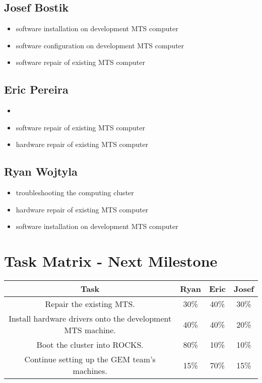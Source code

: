 \documentclass[12pt]{article}
\begin{document}
\subsection{Josef Bostik}

\begin{itemize}
  \item software installation on development MTS computer
  \item software configuration on development MTS computer
  \item software repair of existing MTS computer
\end{itemize}

\subsection{Eric Pereira}

\begin{itemize}
  \item <something about GEM computers>
  \item software repair of existing MTS computer
  \item hardware repair of existing MTS computer
\end{itemize}

\subsection{Ryan Wojtyla}

\begin{itemize}
  \item troubleshooting the computing cluster
  \item hardware repair of existing MTS computer
  \item software installation on development MTS computer
\end{itemize}

\section{Task Matrix - Next Milestone}

\begin{center}
  \begin{tabular}{|c|c|c|c|}
    \hline
    Task & Ryan & Eric & Josef \\
    \hline
    Repair the existing MTS. & 30\% & 40\% & 30\% \\
    Install hardware drivers onto the development MTS machine. & 40\% & 40\% &
                                                                               20\%
    \\
    Boot the cluster into ROCKS. & 80\% & 10\% & 10\% \\
    Continue setting up the GEM team's machines. & 15\% & 70\% & 15\% \\
    \hline
  \end{tabular}
\end{center}
\end{document}
